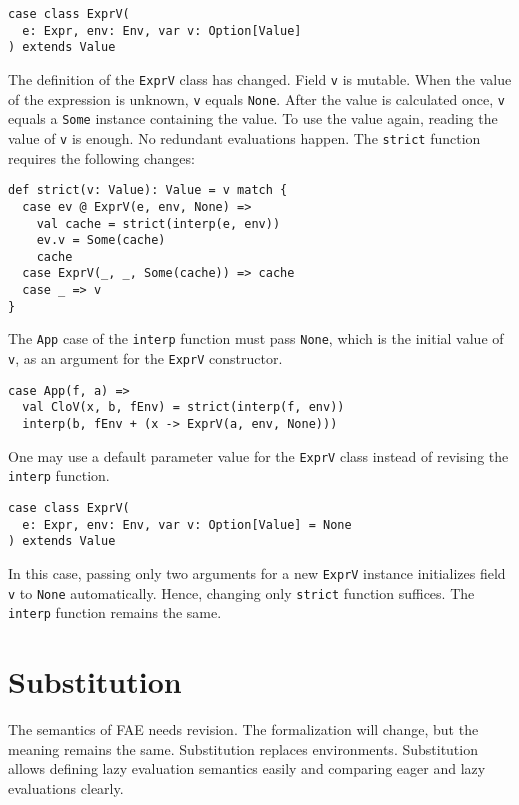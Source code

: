 \begin{verbatim}
case class ExprV(
  e: Expr, env: Env, var v: Option[Value]
) extends Value
\end{verbatim}

The definition of the \verb!ExprV! class has changed. Field \verb!v! is mutable.
When the value of the expression is unknown, \verb!v! equals \verb!None!. After
the value is calculated once, \verb!v! equals a \verb!Some! instance containing
the value. To use the value again, reading the value of \verb!v! is enough. No
redundant evaluations happen. The \verb!strict! function requires the following
changes:

\begin{verbatim}
def strict(v: Value): Value = v match {
  case ev @ ExprV(e, env, None) =>
    val cache = strict(interp(e, env))
    ev.v = Some(cache)
    cache
  case ExprV(_, _, Some(cache)) => cache
  case _ => v
}
\end{verbatim}

The \verb!App! case of the \verb!interp! function must pass \verb!None!, which is
the initial value of \verb!v!, as an argument for the \verb!ExprV! constructor.

\begin{verbatim}
case App(f, a) =>
  val CloV(x, b, fEnv) = strict(interp(f, env))
  interp(b, fEnv + (x -> ExprV(a, env, None)))
\end{verbatim}

One may use a default parameter value for the \verb!ExprV! class instead of
revising the \verb!interp! function.

\begin{verbatim}
case class ExprV(
  e: Expr, env: Env, var v: Option[Value] = None
) extends Value
\end{verbatim}

In this case, passing only two arguments for a new \verb!ExprV! instance
initializes field \verb!v! to \verb!None! automatically. Hence, changing only
\verb!strict! function suffices. The \verb!interp! function remains the same.

\section{Substitution
}

The semantics of FAE needs revision. The formalization will change, but the
meaning remains the same. Substitution replaces environments. Substitution allows
defining lazy evaluation semantics easily and comparing eager and lazy
evaluations clearly.

